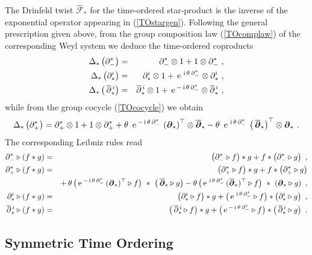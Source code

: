 \documentclass[11pt,a4paper]{article}
\newcommand{\mbf}[1]{{\boldsymbol {#1} }}
\def\ii{{\,{\rm i}\,}}
\def\mdell{{\mbf\partial}}
\def\e{{\,\rm e}\,}
\def\bea{\begin{eqnarray}}
\def\eea{\end{eqnarray}}
\newcommand{\beq}{\begin{eqnarray}}
\newcommand{\eeq}{\end{eqnarray}}
\begin{document}
The Drinfeld twist $\hat{\mathcal F}_*$ for the time-ordered
star-product is the inverse of the exponential operator appearing in
(\ref{TOstargen}). Following the general prescription given above,
from the group composition law (\ref{TOcomplaw}) of the corresponding
Weyl system we deduce the time-ordered coproducts
\bea
\Delta_*\left(\partial_-^*\right)&=&\partial_-^*\otimes1+
1\otimes\partial_-^* \ , \nonumber\\
\Delta_*\left(\partial^i_*\right)&=&\partial^i_*\otimes1+
\e^{\ii\theta\,\partial_-^*}\otimes\partial^i_* \ , \nonumber\\
\Delta_*\left(\,\overline{\partial}{}^{\,i}_*\right)&=&
\overline{\partial}{}^{\,i}_*\otimes1+\e^{-\ii\theta\,\partial_-^*}
\otimes\overline{\partial}{}^{\,i}_* \ ,
\label{TOcoprods}\eea
while from the group cocycle (\ref{TOcocycle}) we obtain
\beq
\Delta_*\left(\partial_+^*\right)=\partial_+^*\otimes1+
1\otimes\partial_+^*+\theta~\e^{-\ii\theta\,
\partial_-^*}\,\left(\mdell_*\right)^\top\otimes\overline{\mdell}_*-\theta~
\e^{\ii\theta\,\partial_-^*}\,
\left(\,\overline{\mdell}_*\right)^\top\otimes\mdell_* \ .
\label{TOcoprodtime}\eeq
The corresponding Leibniz rules read
\bea
\partial_-^*\triangleright(f*g)&=&\left(\partial_-^*\triangleright
f\right)*g+f*\left(\partial_-^*\triangleright g\right) \ , \nonumber\\
\partial_+^*\triangleright(f*g)&=&\left(\partial_+^*\triangleright
f\right)*g+f*\left(\partial_+^*\triangleright g\right)\nonumber\\ &&
+\,\theta\,\bigl(\e^{-\ii\theta\,\partial_-^*}\,(\mdell_*)^\top
\triangleright f\bigr)~*~\left(\,\overline{\mdell}_*
\triangleright g\right)-\theta\,\bigl(\e^{\ii\theta\,\partial_-^*}\,
(\overline{\mdell}_*)^\top
\triangleright f\bigr)~*~\left(\mdell_*\triangleright g\right) \ ,
\nonumber\\ \partial^i_*\triangleright(f*g)&=&\left(\partial^i_*
\triangleright f\right)*g+\bigl(\e^{\ii\theta\,\partial_-^*}
\triangleright f\bigr)*\left(\partial^i_*\triangleright g\right) \ ,
\nonumber\\ \overline{\partial}{}^{\,i}_*
\triangleright(f*g)&=&\left(\,\overline{\partial}{}^{\,i}_*
\triangleright f\right)*g+\bigl(\e^{-\ii\theta\,\partial_-^*}
\triangleright f\bigr)*\left(\,\overline{\partial}{}^{\,i}_*
\triangleright g\right) \ .
\label{TOLeibniz}\eea

\subsection{Symmetric Time Ordering \label{STOcoprod}}
\end{document}
